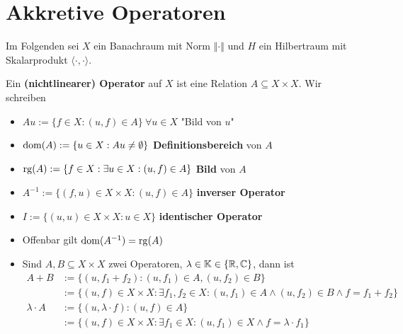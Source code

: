 
\chapter{Akkretive Operatoren}
Im Folgenden sei $X$ ein Banachraum mit Norm $\Vert\cdot\Vert$ und $H$ ein Hilbertraum mit Skalarprodukt $\langle\cdot,\cdot\rangle$.

\begin{definition}
	Ein \textbf{(nichtlinearer) Operator} auf $X$ ist eine Relation $A\subseteq X\times X$. Wir schreiben
	\begin{itemize}
		\item $Au:=\lbrace f\in X:(u,f)\in A\rbrace~\forall u\in X$ "Bild von $u$"
		\item $\operatorname{dom}(A):=\lbrace u\in X:Au\neq\emptyset\rbrace$ \textbf{Definitionsbereich} von $A$
		\item $\operatorname{rg}(A):=\lbrace f\in X:\exists u\in X:(u,f)\in A\rbrace$ \textbf{Bild} von $A$
		\item $A^{-1}:=\lbrace (f,u)\in X\times X:(u,f)\in A\rbrace$ \textbf{inverser Operator}
		\item $I:=\lbrace(u,u)\in X\times X:u\in X\rbrace$ \textbf{identischer Operator}
		\item Offenbar gilt $\operatorname{dom}(A^{-1})=\operatorname{rg}(A)$
		\item Sind $A,B\subseteq X\times X$ zwei Operatoren, $\lambda\in\mathbb{K}\in\lbrace\mathbb{R},\mathbb{C}\rbrace$, dann ist
		\begin{align*}
			A+B&:=\lbrace(u,f_1+f_2):(u,f_1)\in A,(u,f_2)\in B\rbrace\\
			&:=\lbrace(u,f)\in X\times X:\exists f_1,f_2\in X:(u,f_1)\in A\wedge(u,f_2)\in B\wedge f=f_1+f_2\rbrace\\
			\lambda\cdot A&:=\lbrace(u,\lambda\cdot f):(u,f)\in A\rbrace\\
			&:=\lbrace(u,f)\in X\times X:\exists f_1\in X:(u,f_1)\in X\wedge f=\lambda\cdot f_1\rbrace
		\end{align*}
	\end{itemize}
\end{definition}

